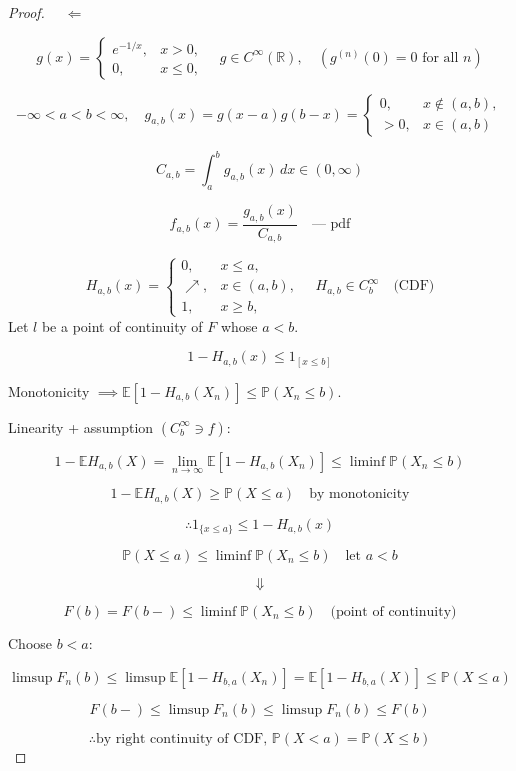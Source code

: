 \documentclass{article}
\newcommand{\1}{\mathds{1}}
\begin{document}
\begin{proof}
    \(\quad \Longleftarrow\)

\[
g(x) = \begin{cases}
e^{-1/x}, & x > 0, \\
0, & x \leq 0,
\end{cases}
\quad g \in C^\infty(\mathbb{R}), \quad \left(g^{(n)}(0) = 0 \text{ for all } n \right)
\]


\[
-\infty < a < b < \infty, \quad g_{a,b}(x) = g(x - a) g(b - x) = 
\begin{cases}
0, & x \notin (a,b), \\
>0, & x \in (a,b)
\end{cases}
\]


\[
C_{a,b} = \int_a^b g_{a,b}(x) \, dx \in (0, \infty)
\]

\[
f_{a,b}(x) = \frac{g_{a,b}(x)}{C_{a,b}} \quad \text{— pdf}
\]


\[
H_{a,b}(x) = 
\begin{cases}
0, & x \leq a, \\
\nearrow, & x \in (a,b), \\
1, & x \geq b,
\end{cases}
\quad H_{a,b} \in C_b^\infty \quad \text{(CDF)}
\]
Let \( l \) be a point of continuity of \( F \) whose \( a < b \).

\[
1 - H_{a,b}(x) \leq 1_{[x \leq b]}
\]

Monotonicity \(\implies \mathbb{E}[1 - H_{a,b}(X_n)] \leq \mathbb{P}(X_n \leq b)\).

Linearity + assumption \((C_b^\infty \ni f)\):

\[
1 - \mathbb{E}H_{a,b}(X) = \lim_{n \to \infty} \mathbb{E}[1 - H_{a,b}(X_n)] \leq \liminf \mathbb{P}(X_n \leq b)
\]

\[
1 - \mathbb{E}H_{a,b}(X) \geq \mathbb{P}(X \leq a) \quad \text{by monotonicity}
\]

\[
\therefore 1_{\{x \leq a\}} \leq 1 - H_{a,b}(x)
\]

\[
\mathbb{P}(X \leq a) \leq \liminf \mathbb{P}(X_n \leq b) \quad \text{let } a < b
\]

\[
\Downarrow
\]

\[
F(b) = F(b-) \leq \liminf \mathbb{P}(X_n \leq b) \quad \text{(point of continuity)}
\]

Choose \( b < a \):

\[
\limsup F_n(b) \leq \limsup \mathbb{E}[1 - H_{b,a}(X_n)] = \mathbb{E}[1 - H_{b,a}(X)] \leq \mathbb{P}(X \leq a)
\]

\[
F(b-) \leq \limsup F_n(b) \leq \limsup F_n(b) \leq F(b)
\]

\[
\therefore \text{by right continuity of CDF, } \mathbb{P}(X < a) = \mathbb{P}(X \leq b)
\]
\end{proof}
\end{document}
